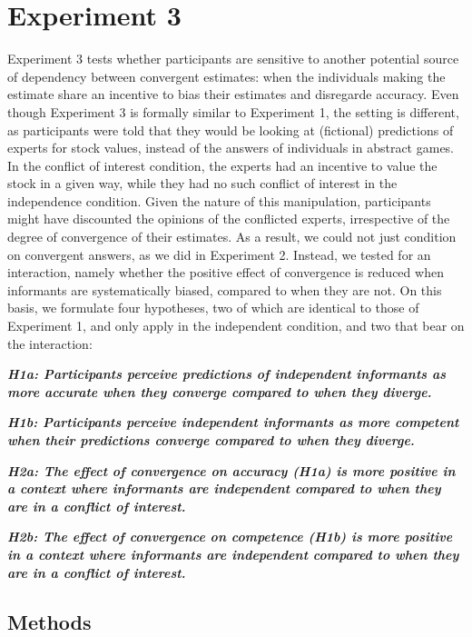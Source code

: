 \documentclass[
  doc,floatsintext]{apa6}
\begin{document}
\section{Experiment 3}\label{experiment-3}

Experiment 3 tests whether participants are sensitive to another potential source of dependency between convergent estimates: when the individuals making the estimate share an incentive to bias their estimates and disregarde accuracy. Even though Experiment 3 is formally similar to Experiment 1, the setting is different, as participants were told that they would be looking at (fictional) predictions of experts for stock values, instead of the answers of individuals in abstract games. In the conflict of interest condition, the experts had an incentive to value the stock in a given way, while they had no such conflict of interest in the independence condition. Given the nature of this manipulation, participants might have discounted the opinions of the conflicted experts, irrespective of the degree of convergence of their estimates. As a result, we could not just condition on convergent answers, as we did in Experiment 2. Instead, we tested for an interaction, namely whether the positive effect of convergence is reduced when informants are systematically biased, compared to when they are not. On this basis, we formulate four hypotheses, two of which are identical to those of Experiment 1, and only apply in the independent condition, and two that bear on the interaction:

\textbf{\emph{H1a: Participants perceive predictions of independent informants as more accurate when they converge compared to when they diverge.}}

\textbf{\emph{H1b: Participants perceive independent informants as more competent when their predictions converge compared to when they diverge.}}

\textbf{\emph{H2a: The effect of convergence on accuracy (H1a) is more positive in a context where informants are independent compared to when they are in a conflict of interest.}}

\textbf{\emph{H2b: The effect of convergence on competence (H1b) is more positive in a context where informants are independent compared to when they are in a conflict of interest.}}

\subsection{Methods}\label{methods-2}
\end{document}
